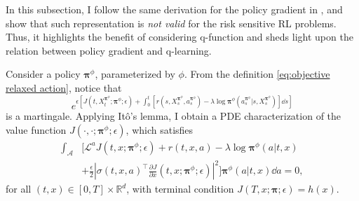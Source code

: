 In this subsection, I follow the same derivation for the policy gradient in \citet{jia2022policypg}, and show that such representation is \textit{not valid} for the risk sensitive RL problems. Thus, it highlights the benefit of considering q-function and sheds light upon the relation between policy gradient and q-learning. 

Consider a policy $\bm\pi^{\phi}$, parameterized by $\phi$. From the definition \eqref{eq:objective relaxed action}, notice that 
\[ e^{\epsilon \left[ J(t,X_t^{\bm\pi^{\phi}};\bm\pi^{\phi};\epsilon) + \int_0^t [r(s,X_s^{\bm\pi^{\phi}},a_s^{\bm\pi^{\phi}}) - \lambda\log\bm\pi^{\phi}(a_s^{\bm\pi^{\phi}}|s,X_s^{\bm\pi^{\phi}})]\dd s \right]} \]
is a martingale. Applying It\^o's lemma, I obtain a PDE characterization of the value function $J(\cdot,\cdot;\bm\pi^{\phi};\epsilon)$, which satisfies
\begin{equation}
	\label{eq:feynman kac risk sensitive}
	\begin{aligned}
		\int_{\mathcal A} & \bigg[ \mathcal{L}^a J(t,x;\bm\pi^{\phi};\epsilon) + r(t,x,a) -\lambda\log \bm\pi^{\phi}(a|t,x) \\
		& +  \frac{\epsilon}{2} |\sigma(t,x,a)^\top\frac{\partial J}{\partial x}(t,x;\bm\pi^{\phi};\epsilon)|^2 \bigg] \bm\pi^{\phi}(a|t,x)\dd a = 0,
	\end{aligned}
\end{equation}
for all $(t,x)\in [0,T]\times \mathbb{R}^d$, with terminal condition $J(T,x;\bm\pi;\epsilon) = h(x)$. 

